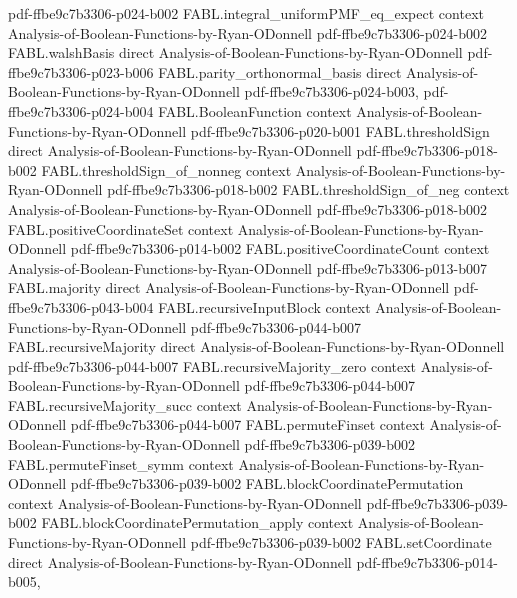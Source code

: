 \begin{theorem}
  {pdf-ffbe9c7b3306-p024-b002}
\proofstep
  {FABL.integral_uniformPMF_eq_expect}
  {context}
  {Analysis-of-Boolean-Functions-by-Ryan-ODonnell}
  {pdf-ffbe9c7b3306-p024-b002}
\proofstep
  {FABL.walshBasis}
  {direct}
  {Analysis-of-Boolean-Functions-by-Ryan-ODonnell}
  {pdf-ffbe9c7b3306-p023-b006}
\proofstep
  {FABL.parity_orthonormal_basis}
  {direct}
  {Analysis-of-Boolean-Functions-by-Ryan-ODonnell}
  {pdf-ffbe9c7b3306-p024-b003,
    pdf-ffbe9c7b3306-p024-b004}
\proofstep
  {FABL.BooleanFunction}
  {context}
  {Analysis-of-Boolean-Functions-by-Ryan-ODonnell}
  {pdf-ffbe9c7b3306-p020-b001}
\proofstep
  {FABL.thresholdSign}
  {direct}
  {Analysis-of-Boolean-Functions-by-Ryan-ODonnell}
  {pdf-ffbe9c7b3306-p018-b002}
\proofstep
  {FABL.thresholdSign_of_nonneg}
  {context}
  {Analysis-of-Boolean-Functions-by-Ryan-ODonnell}
  {pdf-ffbe9c7b3306-p018-b002}
\proofstep
  {FABL.thresholdSign_of_neg}
  {context}
  {Analysis-of-Boolean-Functions-by-Ryan-ODonnell}
  {pdf-ffbe9c7b3306-p018-b002}
\proofstep
  {FABL.positiveCoordinateSet}
  {context}
  {Analysis-of-Boolean-Functions-by-Ryan-ODonnell}
  {pdf-ffbe9c7b3306-p014-b002}
\proofstep
  {FABL.positiveCoordinateCount}
  {context}
  {Analysis-of-Boolean-Functions-by-Ryan-ODonnell}
  {pdf-ffbe9c7b3306-p013-b007}
\proofstep
  {FABL.majority}
  {direct}
  {Analysis-of-Boolean-Functions-by-Ryan-ODonnell}
  {pdf-ffbe9c7b3306-p043-b004}
\proofstep
  {FABL.recursiveInputBlock}
  {context}
  {Analysis-of-Boolean-Functions-by-Ryan-ODonnell}
  {pdf-ffbe9c7b3306-p044-b007}
\proofstep
  {FABL.recursiveMajority}
  {direct}
  {Analysis-of-Boolean-Functions-by-Ryan-ODonnell}
  {pdf-ffbe9c7b3306-p044-b007}
\proofstep
  {FABL.recursiveMajority_zero}
  {context}
  {Analysis-of-Boolean-Functions-by-Ryan-ODonnell}
  {pdf-ffbe9c7b3306-p044-b007}
\proofstep
  {FABL.recursiveMajority_succ}
  {context}
  {Analysis-of-Boolean-Functions-by-Ryan-ODonnell}
  {pdf-ffbe9c7b3306-p044-b007}
\proofstep
  {FABL.permuteFinset}
  {context}
  {Analysis-of-Boolean-Functions-by-Ryan-ODonnell}
  {pdf-ffbe9c7b3306-p039-b002}
\proofstep
  {FABL.permuteFinset_symm}
  {context}
  {Analysis-of-Boolean-Functions-by-Ryan-ODonnell}
  {pdf-ffbe9c7b3306-p039-b002}
\proofstep
  {FABL.blockCoordinatePermutation}
  {context}
  {Analysis-of-Boolean-Functions-by-Ryan-ODonnell}
  {pdf-ffbe9c7b3306-p039-b002}
\proofstep
  {FABL.blockCoordinatePermutation_apply}
  {context}
  {Analysis-of-Boolean-Functions-by-Ryan-ODonnell}
  {pdf-ffbe9c7b3306-p039-b002}
\proofstep
  {FABL.setCoordinate}
  {direct}
  {Analysis-of-Boolean-Functions-by-Ryan-ODonnell}
  {pdf-ffbe9c7b3306-p014-b005,
}
\end{theorem}
